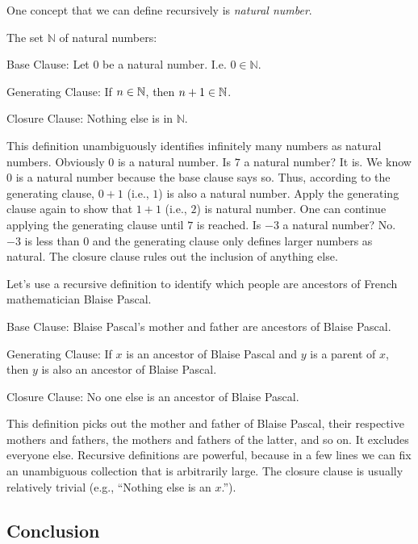 One concept that we can define recursively is \emph{natural number}.
\begin{majorILnc}{} The set $\mathbb{N}$ of natural numbers:
	\begin{cenumerate}
		\item Base Clause: Let $0$ be a natural number. I.e. $0 \in \mathbb{N}$.
		\item Generating Clause: If $n \in \mathbb{N}$, then $n+1 \in \mathbb{N}$.
		\item Closure Clause: Nothing else is in $\mathbb{N}$.  
	\end{cenumerate}
\end{majorILnc}
This definition unambiguously identifies infinitely many numbers as natural numbers. 
Obviously $0$ is a natural number. 
Is $7$ a natural number? 
It is. We know $0$ is a natural number because the base clause says so. 
Thus, according to the generating clause, $0+1$ (i.e., $1$) is also a natural number. Apply the generating clause again to show that $1+1$ (i.e., $2$) is natural number. One can continue applying the generating clause until $7$ is reached. 
Is $-3$ a natural number? No. $-3$ is less than $0$ and the generating clause only defines larger numbers as natural. The closure clause rules out the inclusion of anything else.

Let's use a recursive definition to identify which people are ancestors of French mathematician Blaise Pascal.

\begin{cenumerate}
	\item Base Clause: Blaise Pascal's mother and father are ancestors of Blaise Pascal.
	\item Generating Clause: If $x$ is an ancestor of Blaise Pascal and $y$ is a parent of $x$, then $y$ is also an ancestor of Blaise Pascal.
	\item Closure Clause: No one else is an ancestor of Blaise Pascal.
\end{cenumerate}
\noindent{}This definition picks out the mother and father of Blaise Pascal, their respective mothers and fathers, the mothers and fathers of the latter, and so on.  It excludes everyone else. Recursive definitions are powerful, because in a few lines we can fix an unambiguous collection that is arbitrarily large. The closure clause is usually relatively trivial (e.g., ``Nothing else is an $x$.'').

\subsection{Conclusion}\label{Conclusion}

